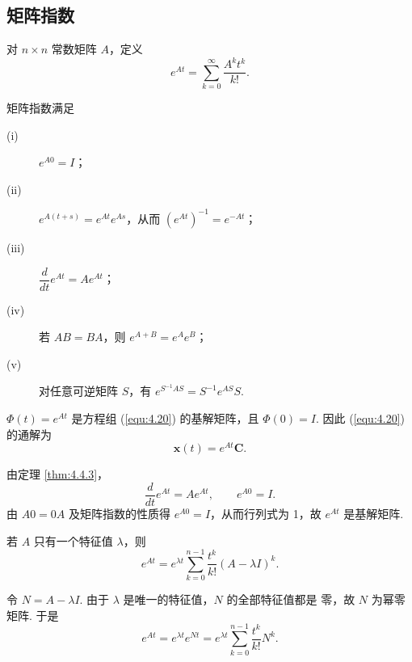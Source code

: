 \subsection{矩阵指数}

\begin{deff}[(矩阵指数)]
对 $n\times n$ 常数矩阵 $A$，定义
\begin{equation}\label{equ:4.26}
e^{At}
=\sum_{k=0}^{\infty}\frac{A^kt^k}{k!}.
\end{equation}
\end{deff}

\begin{thm}\label{thm:4.4.3}
矩阵指数满足
\begin{description}
\item[(i)] $e^{A0}=I$；
\item[(ii)] $e^{A(t+s)}=e^{At}e^{As}$，从而 $(e^{At})^{-1}=e^{-At}$；
\item[(iii)] $\dfrac{d}{dt}e^{At}=Ae^{At}$；
\item[(iv)] 若 $AB=BA$，则 $e^{A+B}=e^Ae^B$；
\item[(v)] 对任意可逆矩阵 $S$，有
$e^{S^{-1}AS}=S^{-1}e^{AS}S$.
\end{description}
\end{thm}

\begin{thm}\label{thm:4.4.4}
$\Phi(t)=e^{At}$ 是方程组 (\ref{equ:4.20}) 的基解矩阵，且
$\Phi(0)=I$. 因此 (\ref{equ:4.20}) 的通解为
\[
\bm{x}(t)=e^{At}\bm{C}.
\]
\end{thm}

\begin{pf1}
由定理 \ref{thm:4.4.3}，
\[
\frac{d}{dt}e^{At}=Ae^{At},\qquad e^{A0}=I.
\]
由 $A0=0A$ 及矩阵指数的性质得
$e^{A0}=I$，从而行列式为 1，故 $e^{At}$ 是基解矩阵.
\end{pf1}

\begin{cor}\label{cor:4.4.1}
若 $A$ 只有一个特征值 $\lambda$，则
\begin{equation}\label{equ:4.27}
e^{At}
=e^{\lambda t}\sum_{k=0}^{n-1}
\frac{t^k}{k!}(A-\lambda I)^k.
\end{equation}
\end{cor}

\begin{pf1}
令 $N=A-\lambda I$. 由于 $\lambda$ 是唯一的特征值，$N$ 的全部特征值都是
零，故 $N$ 为幂零矩阵. 于是
\[
e^{At}
=e^{\lambda t}e^{Nt}
=e^{\lambda t}\sum_{k=0}^{n-1}\frac{t^k}{k!}N^k.
\]
\end{pf1}

